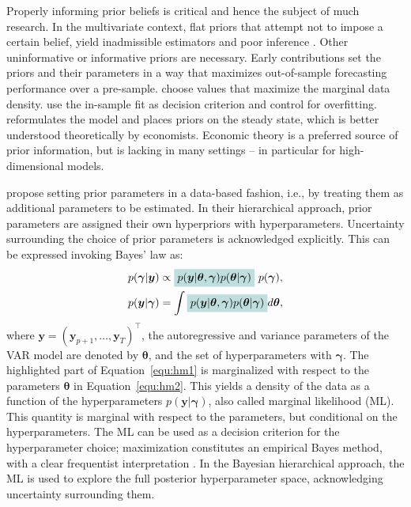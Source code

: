 \documentclass[article,nojss]{jss} %
\newcommand{\hteal}[1]{\colorbox{teal1!25}{$\displaystyle#1$}}
\newcommand{\htteal}[1]{\colorbox{teal1!25}{#1}}
\begin{document}
Properly informing prior beliefs is critical and hence the subject of much research.
In the multivariate context, flat priors that attempt not to impose a certain belief, yield inadmissible estimators \citep{stein1956} and poor inference \citep{sims1980, banbura2010}. Other uninformative or informative priors are necessary. Early contributions \citep{litterman1980} set the priors and their parameters in a way that maximizes out-of-sample forecasting performance over a pre-sample. \cite{delnegro2004} choose values that maximize the marginal data density. \cite{banbura2010} use the in-sample fit as decision criterion and control for overfitting.
\cite{villani2009} reformulates the model and places priors on the steady state, which is better understood theoretically by economists. Economic theory is a preferred source of prior information, but is lacking in many settings -- in particular for high-dimensional models.

\cite{giannone2015} propose setting prior parameters in a data-based fashion, i.e., by treating them as additional parameters to be estimated. In their hierarchical approach, prior parameters are assigned their own hyperpriors with hyperparameters. Uncertainty surrounding the choice of prior parameters is acknowledged explicitly.
This can be expressed invoking Bayes' law as:
\begin{align}
  \label{equ:hm1}
  p(\boldsymbol{\gamma} | \boldsymbol{y}) & \propto \hteal{p(\boldsymbol{y} | \boldsymbol{\theta}, \boldsymbol{\gamma}) p(\boldsymbol{\theta} | \boldsymbol{\gamma})} ~ p(\boldsymbol{\gamma}),
  \\
  \label{equ:hm2}
  p(\boldsymbol{y} | \boldsymbol{\gamma}) & = \int \hteal{p(\boldsymbol{y} | \boldsymbol{\theta}, \boldsymbol{\gamma}) p(\boldsymbol{\theta} | \boldsymbol{\gamma})} d \boldsymbol{\theta},
\end{align}
where $\boldsymbol{y} = (\boldsymbol{y}_{p+1}, \ldots, \boldsymbol{y}_{T})^\top$, the autoregressive and variance parameters of the VAR model are denoted by $\boldsymbol{\theta}$, and the set of hyperparameters with $\boldsymbol{\gamma}$. The \htteal{highlighted} part of Equation~\ref{equ:hm1} is marginalized with respect to the parameters $\boldsymbol{\theta}$ in Equation~\ref{equ:hm2}. This yields a density of the data as a function of the hyperparameters $p(\boldsymbol{y} | \boldsymbol{\gamma})$, also called marginal likelihood (ML). This quantity is marginal with respect to the parameters, but conditional on the hyperparameters.
The ML can be used as a decision criterion for the hyperparameter choice; maximization constitutes an empirical Bayes method, with a clear frequentist interpretation \citep{giannone2015}.
In the Bayesian hierarchical approach, the ML is used to explore the full posterior hyperparameter space, acknowledging uncertainty surrounding them.
\end{document}
